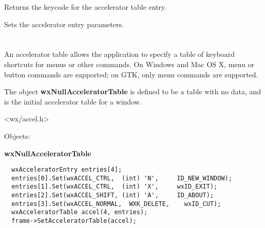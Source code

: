 \label{wxacceleratorentrygetkeycode}


Returns the keycode for the accelerator table entry.

\label{wxacceleratorentryset}


Sets the accelerator entry parameters.





\section{}\label{wxacceleratortable}

An accelerator table allows the application to specify a table of keyboard shortcuts for
menus or other commands. On Windows and Mac OS X, menu or button commands are supported; on GTK,
only menu commands are supported.

The object {\bf wxNullAcceleratorTable} is defined to be a table with no data, and is the
initial accelerator table for a window.




<wx/accel.h>




Objects:

{\bf wxNullAcceleratorTable}


{\small%
\begin{verbatim}
  wxAcceleratorEntry entries[4];
  entries[0].Set(wxACCEL_CTRL,  (int) 'N',     ID_NEW_WINDOW);
  entries[1].Set(wxACCEL_CTRL,  (int) 'X',     wxID_EXIT);
  entries[2].Set(wxACCEL_SHIFT, (int) 'A',     ID_ABOUT);
  entries[3].Set(wxACCEL_NORMAL,  WXK_DELETE,    wxID_CUT);
  wxAcceleratorTable accel(4, entries);
  frame->SetAcceleratorTable(accel);
\end{verbatim}
}%

